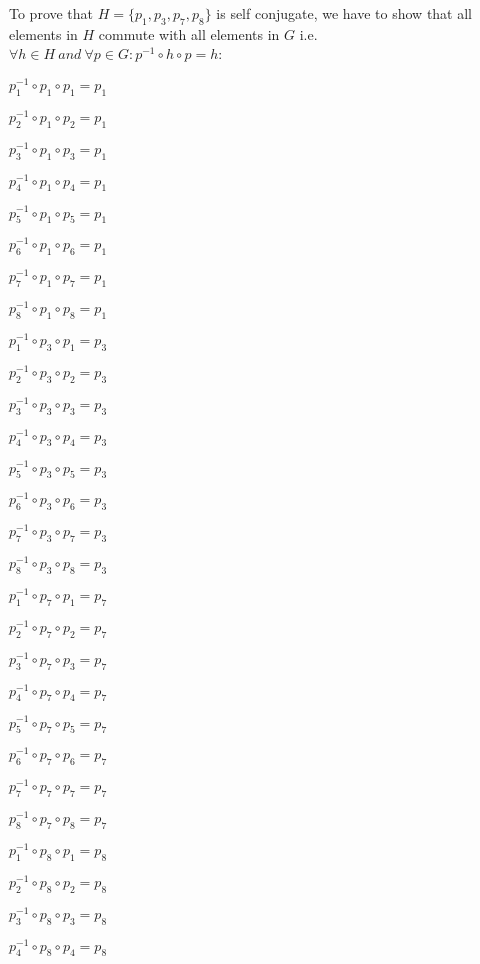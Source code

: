 \documentclass{article}
\begin{document}
\noindent
To prove that $H = \{p_1,p_3,p_7,p_8\}$ is self conjugate, we have to show that all elements in $H$ commute with all elements in $G$ i.e. $\forall h \in H \ and \ \forall p \in G: p^{-1} \circ h \circ p = h$:
\newline

$p_1^{-1} \circ p_1 \circ p_1 = p_1$

$p_2^{-1} \circ p_1 \circ p_2 = p_1$

$p_3^{-1} \circ p_1 \circ p_3 = p_1$

$p_4^{-1} \circ p_1 \circ p_4 = p_1$

$p_5^{-1} \circ p_1 \circ p_5 = p_1$

$p_6^{-1} \circ p_1 \circ p_6 = p_1$

$p_7^{-1} \circ p_1 \circ p_7 = p_1$

$p_8^{-1} \circ p_1 \circ p_8 = p_1$
\newline

$p_1^{-1} \circ p_3 \circ p_1 = p_3$

$p_2^{-1} \circ p_3 \circ p_2 = p_3$

$p_3^{-1} \circ p_3 \circ p_3 = p_3$

$p_4^{-1} \circ p_3 \circ p_4 = p_3$

$p_5^{-1} \circ p_3 \circ p_5 = p_3$

$p_6^{-1} \circ p_3 \circ p_6 = p_3$

$p_7^{-1} \circ p_3 \circ p_7 = p_3$

$p_8^{-1} \circ p_3 \circ p_8 = p_3$
\newline

$p_1^{-1} \circ p_7 \circ p_1 = p_7$

$p_2^{-1} \circ p_7 \circ p_2 = p_7$

$p_3^{-1} \circ p_7 \circ p_3 = p_7$

$p_4^{-1} \circ p_7 \circ p_4 = p_7$

$p_5^{-1} \circ p_7 \circ p_5 = p_7$

$p_6^{-1} \circ p_7 \circ p_6 = p_7$

$p_7^{-1} \circ p_7 \circ p_7 = p_7$

$p_8^{-1} \circ p_7 \circ p_8 = p_7$
\newline

$p_1^{-1} \circ p_8 \circ p_1 = p_8$

$p_2^{-1} \circ p_8 \circ p_2 = p_8$

$p_3^{-1} \circ p_8 \circ p_3 = p_8$

$p_4^{-1} \circ p_8 \circ p_4 = p_8$
\end{document}

